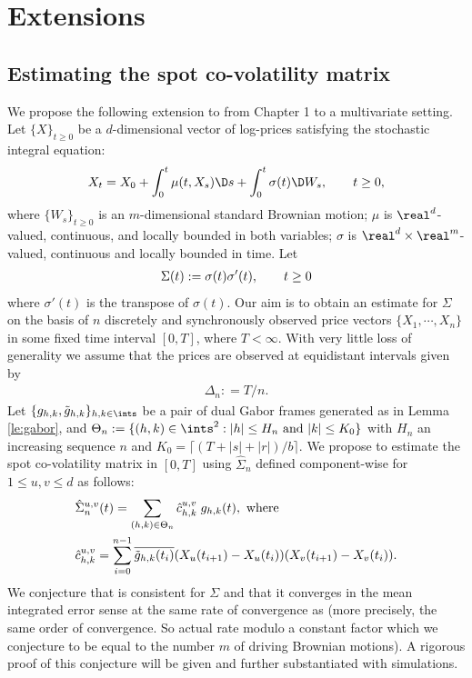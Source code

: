 \section{Extensions}
\subsection{Estimating the spot co-volatility matrix}
We propose the following extension to \svn from Chapter 1 to a multivariate setting. Let $\{X\}_{t \ge 0}$ be a $d$-dimensional vector of log-prices satisfying the stochastic integral equation:
\begin{align}
  X_t = X_0 + \int^t_0 \mu(t, X_s) \D s + \int^t_0 \sigma(t) \D W_s, \qquad  t \ge 0,\notag
  \label{}
\end{align}
where $\{W_s\}_{t \ge 0}$ is an $m$-dimensional standard Brownian motion; $\mu$ is  $\real^d$-valued, continuous, and locally bounded in both variables; $\sigma$ is $\real^d \times \real^m$-valued, continuous and locally bounded in time.   Let 
\begin{align}
  \Sigma (t) := \sigma(t)\sigma'(t), \qquad t \ge  0\notag
  \label{}
\end{align}
where $\sigma'(t)$ is the transpose of $\sigma(t)$. Our aim is to obtain an estimate for $\Sigma$ on the basis of $n$ discretely and synchronously  observed price vectors $\{X_1,\cdots,X_n\}$ in some fixed time interval $[0,T]$, where $T < \infty$. With very little loss of generality we assume that the prices are observed at equidistant intervals given by 
\begin{align}
\Delta_n : = T/n.
\end{align}
Let $\{g_{h,k}, \tghk\}_{h,k \in \ints}$ be a pair of dual Gabor frames generated as in Lemma \eqref{le:gabor}, and $\Theta_n := \{(h,k) \in \ints^2 : |h| \le H_n \text{ and }|k| \le K_0\}$ with $H_n$ an increasing sequence $n$ and $K_0= \lceil (T + |s| + |r|)/b \rceil$. 
We propose to estimate the spot co-volatility matrix in $[0,T]$ using $\hat{\Sigma}_n$ defined component-wise for $1 \le u,v \le d$ as follows:
\begin{align}
  &\hat{\Sigma}_n^{u,v}(t) = \sum_{(h,k) \in \Theta_n} \hat{c}_{h,k}^{u,v}\;g_{h,k}(t), \text{ where}\label{eq:Sigma}\\
  &\hat{c}_{h,k}^{u,v} = \sum_{i =0}^{n-1} \overline{\tilde{g}_{h,k}(t_i)} (X_u(t_{i+1}) - X_u(t_i))(X_v(t_{i+1}) - X_v(t_i)).
  \label{}
\end{align}
We conjecture that \Svn is consistent for $\Sigma$ and that it converges in the mean integrated error sense at the same rate of convergence as \svn (more precisely, the same order of convergence. So actual rate modulo a constant factor which we conjecture to be equal to the number $m$ of driving Brownian motions). A rigorous proof of this conjecture will be given and further substantiated with simulations.
